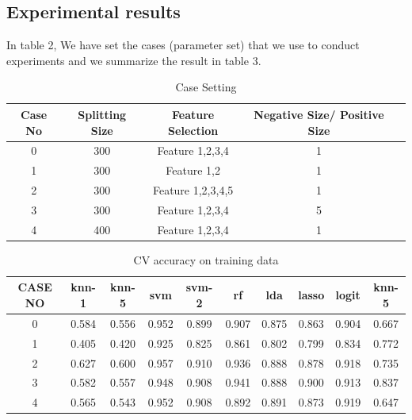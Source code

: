 \documentclass[11pt,letterpaper]{article}
\begin{document}
\subsection{Experimental results}
\label{sec:experimental-results}
	
In table 2, We have set the cases (parameter set) that we use to conduct experiments and we summarize the result in table 3.
	
	\begin{table}
		\centering
		\caption{Case Setting}
		\begin{tabular}{c|c|c|c|c}
			Case No & Splitting Size & Feature Selection & Negative Size/ Positive Size \\ \hline
			0 & 300 & Feature 1,2,3,4 & 1 \\
			1 & 300 & Feature 1,2     & 1  \\
			2 & 300 & Feature 1,2,3,4,5 & 1 \\
			3 & 300 & Feature 1,2,3,4 & 5  \\
			4 & 400 & Feature 1,2,3,4 & 1 \\
		\end{tabular}
	\end{table}

	\begin{table}
	\centering
	\caption{CV accuracy on training data}
	\begin{tabular}{|c|c|c|c|c|c|c|c|c|c|}
	\hline
	CASE NO	& knn-1	& knn-5	& svm	& svm-2	& rf	& lda	& lasso &	logit	& knn-5 \\ \hline
0	& 0.584	 & 0.556	& 0.952 &	0.899	& 0.907	& 0.875 &	0.863	& 0.904 & 0.667 \\ \hline
1	& 0.405	 & 0.420	& 0.925	& 0.825	& 0.861	& 0.802	& 0.799	& 0.834	& 0.772 \\ \hline
2	& 0.627	& 0.600	& 0.957	& 0.910	& 0.936	& 0.888	& 0.878	& 0.918	& 0.735 \\ \hline
3	& 0.582	& 0.557	& 0.948	& 0.908	& 0.941	& 0.888	& 0.900	& 0.913	& 0.837 \\ \hline
4	& 0.565	& 0.543	& 0.952	& 0.908	& 0.892	& 0.891	& 0.873	& 0.919	& 0.647 \\ \hline
	\end{tabular}
	\end{table}
\end{document}

